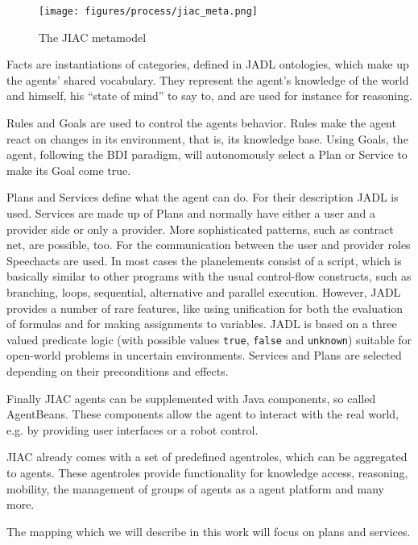 \begin{figure}[htp]
	\centering
	\texttt{[image: figures/process/jiac\_meta.png]}
	\caption{The JIAC metamodel}
	\label{fig:jiacmodel}
\end{figure}

Facts are instantiations of categories, defined in JADL ontologies, which make up the agents' shared vocabulary. They represent the agent's knowledge of the world and himself, his ``state of mind'' to say to, and are used for instance for reasoning.

Rules and Goals are used to control the agents behavior. Rules make the agent react on changes in its environment, that is, its knowledge base. Using Goals, the agent, following the BDI paradigm, will autonomously select a Plan or Service to make its Goal come true.

Plans and Services define what the agent can do. For their description JADL is used. Services are made up of Plans and normally have either a user and a provider side or only a provider. More sophisticated patterns, such as contract net, are possible, too. For the communication between the user and provider roles Speechacts are used. In most cases the planelements consist of a script, which is basically similar to other programs with the usual control-flow constructs, such as branching, loops, sequential, alternative and parallel execution. However, JADL provides a number of rare features, like using unification for both the evaluation of formulas and for making assignments to variables. JADL is based on a three valued predicate logic (with possible values \verb|true|, \verb|false| and \verb|unknown|) suitable for open-world problems in uncertain environments. Services and Plans are selected depending on their preconditions and effects.

Finally JIAC agents can be supplemented with Java components, so called AgentBeans. These components allow the agent to interact with the real world, e.g. by providing user interfaces or a robot control.

JIAC already comes with a set of predefined agentroles, which can be aggregated to agents. These agentroles provide functionality for knowledge access, reasoning, mobility, the management of groups of agents as a agent platform and many more.

The mapping which we will describe in this work will focus on plans and services.



